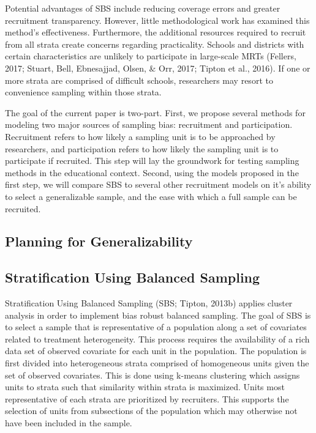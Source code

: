 \documentclass[man]{apa6}
\begin{document}
Potential advantages of SBS include reducing coverage errors and greater recruitment transparency. However, little methodological work has examined this method's effectiveness. Furthermore, the additional resources required to recruit from all strata create concerns regarding practicality. Schools and districts with certain characteristics are unlikely to participate in large-scale MRTs (Fellers, 2017; Stuart, Bell, Ebnesajjad, Olsen, \& Orr, 2017; Tipton et al., 2016). If one or more strata are comprised of difficult schools, researchers may resort to convenience sampling within those strata.

The goal of the current paper is two-part. First, we propose several methods for modeling two major sources of sampling bias: recruitment and participation. Recruitment refers to how likely a sampling unit is to be approached by researchers, and participation refers to how likely the sampling unit is to participate if recruited. This step will lay the groundwork for testing sampling methods in the educational context. Second, using the models proposed in the first step, we will compare SBS to several other recruitment models on it's ability to select a generalizable sample, and the ease with which a full sample can be recruited.

\hypertarget{planning-for-generalizability}{%
\subsection{Planning for Generalizability}\label{planning-for-generalizability}}

\hypertarget{stratification-using-balanced-sampling}{%
\subsection{Stratification Using Balanced Sampling}\label{stratification-using-balanced-sampling}}

Stratification Using Balanced Sampling \nocite{tipton2013CA}(SBS; Tipton, 2013b) applies cluster analysis in order to implement bias robust balanced sampling. The goal of SBS is to select a sample that is representative of a population along a set of covariates related to treatment heterogeneity. This process requires the availability of a rich data set of observed covariate for each unit in the population. The population is first divided into heterogeneous strata comprised of homogeneous units given the set of observed covariates. This is done using k-means clustering which assigns units to strata such that similarity within strata is maximized. Units most representative of each strata are prioritized by recruiters. This supports the selection of units from subsections of the population which may otherwise not have been included in the sample.
\end{document}
